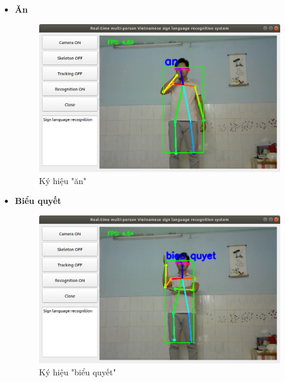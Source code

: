 \documentclass[12pt,a4paper,oneside]{book}
\numberwithin{equation}{chapter} %
\numberwithin{figure}{chapter} %
\numberwithin{table}{chapter} %
\begin{document}
\begin{itemize}
\item \textbf{Ăn}
\FloatBarrier
\begin{figure}[htp]
\begin{center}
\includegraphics[scale=0.4]{kq/an.png}
\end{center}
\caption{Ký hiệu "ăn"}
\end{figure}
\FloatBarrier

\item \textbf{Biểu quyết}
\FloatBarrier
\begin{figure}[htp]
\begin{center}
\includegraphics[scale=0.4]{kq/bieu_quyet.png}
\end{center}
\caption{Ký hiệu "biểu quyết"}
\end{figure}
\FloatBarrier

\thispagestyle{phuluc}
\pagebreak


\end{itemize}
\end{document}
